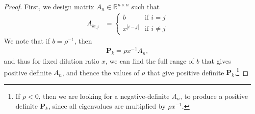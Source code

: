 \documentclass[11pt, letterpaper]{article}
\newcommand{\mbb}[1]{\mathbb{#1}}
\numberwithin{equation}{section}
\begin{document}
\begin{proof}
First, we design matrix $A_n \in \mbb R ^{n\times n}$ such that 
\begin{align*}
A_{k_{i,j}}  &= \begin{cases}
b & \text{if } i = j \\
x ^{|i-j|} & \text{if } i \neq j 
\end{cases} 
\end{align*} 
We note that if $b = \rho ^{-1}$, then 
\begin{align}
\bm P_k = \rho x^{-1} A_n, \label{eqn:PtoA}
\end{align} 
and thus for fixed dilution ratio $x$, we can find the full range of $b$ that gives positive definite $A_n$, and thence the values of $\rho$ that give positive definite $\bm P_k$.\footnote{If $\rho < 0$, then we are looking for a negative-definite $A_n$, to produce a positive definite $\bm P_k$, since all eigenvalues are multiplied by $\rho x^{-1}$. }



\end{proof}
\end{document}

